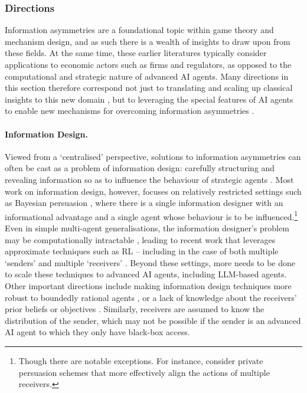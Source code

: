 \subsubsection{Directions}

Information asymmetries are a foundational topic within game theory and mechanism design, and as such there is a wealth of insights to draw upon from these fields.
At the same time, these earlier literatures typically consider applications to economic actors such as firms and regulators, as opposed to the computational and strategic nature of advanced AI agents.
Many directions in this section therefore correspond not just to translating and scaling up classical insights to this new domain \citep{Wu2022,Levinstein2023,Treutlein2021}, but to leveraging the special features of AI agents to enable new mechanisms for overcoming information asymmetries \citep{digiovanni2023commitment,tennenholtz2004program,Conitzer2023}.



\paragraph{Information Design.}
Viewed from a `centralised' perspective, solutions to information asymmetries can often be cast as a problem of {information design}: carefully structuring and revealing information so as to influence the behaviour of strategic agents \citep{Bergemann2019}.
Most work on information design, however, focuses on relatively restricted settings such as Bayesian persuasion \citep{Kamenica2011}, where there is a single information designer with an informational advantage and a single agent whose behaviour is to be influenced.\footnote{Though there are notable exceptions. For instance, \citet{Arieli2019,haghtalab2025platforms} consider private persuasion schemes that more effectively align the actions of multiple receivers.}
Even in simple multi-agent generalisations, the information designer's problem may be computationally intractable \citep{Dughmi2019}, leading to recent work that leverages approximate techniques such as RL \citep{Wu2022} -- including in the case of both multiple `senders' \citep{Hossain2024} and multiple `receivers' \citep{Ivanov2023}. 
Beyond these settings, more needs to be done to 
scale these techniques to advanced AI agents, including LLM-based agents.
Other important directions include making information design techniques more robust to boundedly rational agents \citep{Yang2024}, or a lack of knowledge about the receivers' prior beliefs \citep{Lin2024} or objectives \citep{Bacchiocchi2024}.
Similarly, receivers are assumed to know the distribution of the sender, which may not be possible if the sender is an advanced AI agent to which they only have black-box access.

